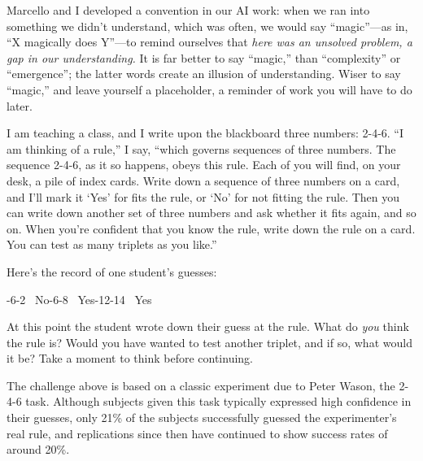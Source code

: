 {
 Marcello and I developed a convention in our AI work: when we ran
into something we didn't understand, which was often,
we would say ``magic''---as in,
``X magically does Y''---to remind
ourselves that \textit{here was an unsolved problem, a gap in our
understanding.} It is far better to say
``magic,'' than
``complexity'' or
``emergence''; the latter words
create an illusion of understanding. Wiser to say
``magic,'' and leave yourself a
placeholder, a reminder of work you will have to do later.}

\myendsectiontext


{
 I am teaching a class, and I write upon the blackboard three
numbers: 2-4-6. ``I am thinking of a
rule,'' I say, ``which governs
sequences of three numbers. The sequence 2-4-6, as it so happens, obeys
this rule. Each of you will find, on your desk, a pile of index cards.
Write down a sequence of three numbers on a card, and
I'll mark it `Yes' for
fits the rule, or `No' for not fitting
the rule. Then you can write down another set of three numbers and ask
whether it fits again, and so on. When you're confident
that you know the rule, write down the rule on a card. You can test as
many triplets as you like.'' }

{
 Here's the record of one student's
guesses:\newline
}

{-6-2 ~No-6-8 ~Yes-12-14 ~Yes
\par}


\bigskip

{
 At this point the student wrote down their guess at the rule. What
do \textit{you} think the rule is? Would you have wanted to test
another triplet, and if so, what would it be? Take a moment to think
before continuing. }

{
 The challenge above is based on a classic experiment due to Peter
Wason, the 2-4-6 task. Although subjects given this task typically
expressed high confidence in their guesses, only 21\% of the subjects
successfully guessed the experimenter's real rule, and
replications since then have continued to show success rates of around
20\%.}

